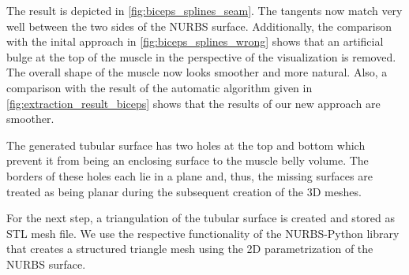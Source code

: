 The result is depicted in \cref{fig:biceps_splines_seam}. The tangents now match very well between the two sides of the NURBS surface. Additionally, the comparison with the inital approach in \cref{fig:biceps_splines_wrong} shows that an artificial bulge at the top of the muscle in the perspective of the visualization is removed. The overall shape of the muscle now looks smoother and more natural. Also, a comparison with the result of the automatic algorithm given in \cref{fig:extraction_result_biceps} shows that the results of our new approach are smoother.

The generated tubular surface has two holes at the top and bottom which prevent it from being an enclosing surface to the muscle belly volume. The borders of these holes each lie in a plane and, thus, the missing surfaces are treated as being planar during the subsequent creation of the 3D meshes.

For the next step, a triangulation of the tubular surface is created and stored as STL mesh file. We use the respective functionality of the NURBS-Python library that creates a structured triangle mesh using the 2D parametrization of the NURBS surface.

